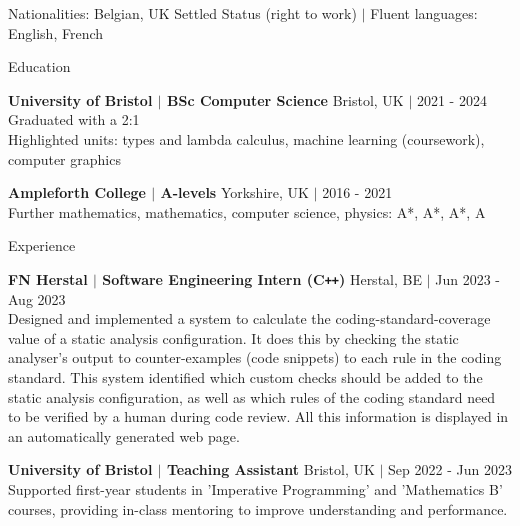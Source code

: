 \documentclass{resume} %
\begin{document}
\vspace{-10pt}
\begin{center}
    Nationalities: Belgian, UK Settled Status (right to work) ${\vert}$ Fluent languages: English, French
\end{center}

\begin{rSection}{Education}

{\bf University of Bristol $\boldsymbol{\vert}$ BSc Computer Science} \hfill Bristol, UK $\boldsymbol{\vert}$ 2021 - 2024 \\
Graduated with a 2:1 \\
Highlighted units: types and lambda calculus, machine learning (coursework), computer graphics

{\bf Ampleforth College $\boldsymbol{\vert}$ A-levels} \hfill Yorkshire, UK $\boldsymbol{\vert}$ 2016 - 2021 \\
Further mathematics, mathematics, computer science, physics: A*, A*, A*, A

\end{rSection}


\begin{rSection}{Experience}

\textbf{FN Herstal $\boldsymbol{\vert}$ Software Engineering Intern (C\texttt{++})} \hfill Herstal, BE $\boldsymbol{\vert}$ Jun 2023 - Aug 2023 \\
Designed and implemented a system to calculate the coding-standard-coverage value of a static analysis configuration. It does this by checking the static analyser's output to counter-examples (code snippets) to each rule in the coding standard. This system identified which custom checks should be added to the static analysis configuration, as well as which rules of the coding standard need to be verified by a human during code review. All this information is displayed in an automatically generated web page.

\textbf{University of Bristol $\boldsymbol{\vert}$ Teaching Assistant} \hfill Bristol, UK $\boldsymbol{\vert}$ Sep 2022 - Jun 2023 \\
Supported first-year students in 'Imperative Programming' and 'Mathematics B' courses, providing in-class mentoring to improve understanding and performance.

\end{rSection}
\end{document}
